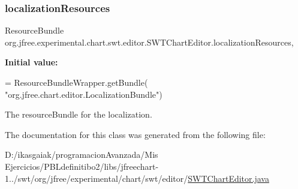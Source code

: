 \subsubsection{\texorpdfstring{localization\+Resources}{localizationResources}}
{\footnotesize\ttfamily Resource\+Bundle org.\+jfree.\+experimental.\+chart.\+swt.\+editor.\+S\+W\+T\+Chart\+Editor.\+localization\+Resources\hspace{0.3cm}{\ttfamily [static]}, {\ttfamily [protected]}}

{\bfseries Initial value\+:}
\begin{DoxyCode}
= ResourceBundleWrapper.getBundle(
                    \textcolor{stringliteral}{"org.jfree.chart.editor.LocalizationBundle"})
\end{DoxyCode}
The resource\+Bundle for the localization. 

The documentation for this class was generated from the following file\+:\begin{DoxyCompactItemize}
\item 
D\+:/ikasgaiak/programacion\+Avanzada/\+Mis Ejercicios/\+P\+B\+Ldefinitibo2/libs/jfreechart-\/1../swt/org/jfree/experimental/chart/swt/editor/\mbox{\hyperlink{_s_w_t_chart_editor_8java}{S\+W\+T\+Chart\+Editor.\+java}}\end{DoxyCompactItemize}
